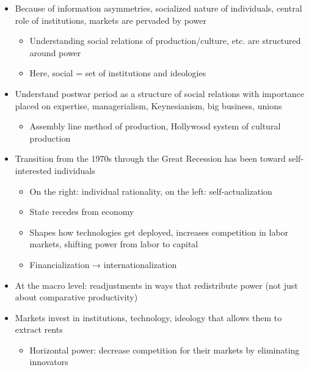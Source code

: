 \begin{itemize}
\tightlist
\item
  Because of information asymmetries, socialized nature of individuals,
  central role of institutions, markets are pervaded by power

  \begin{itemize}
  \tightlist
  \item
    Understanding social relations of production/culture, etc. are
    structured around power
  \item
    Here, social = set of institutions and ideologies
  \end{itemize}
\item
  Understand postwar period as a structure of social relations with
  importance placed on expertise, managerialism, Keynesianism, big
  business, unions

  \begin{itemize}
  \tightlist
  \item
    Assembly line method of production, Hollywood system of cultural
    production
  \end{itemize}
\item
  Transition from the 1970s through the Great Recession has been toward
  self-interested individuals

  \begin{itemize}
  \tightlist
  \item
    On the right: individual rationality, on the left:
    self-actualization
  \item
    State recedes from economy
  \item
    Shapes how technologies get deployed, increases competition in labor
    markets, shifting power from labor to capital
  \item
    Financialization → internationalization
  \end{itemize}
\item
  At the macro level: readjustments in ways that redistribute power (not
  just about comparative productivity)
\item
  Markets invest in institutions, technology, ideology that allows them
  to extract rents

  \begin{itemize}
  \tightlist
  \item
    Horizontal power: decrease competition for their markets by
    eliminating innovators


\end{itemize}
\end{itemize}
